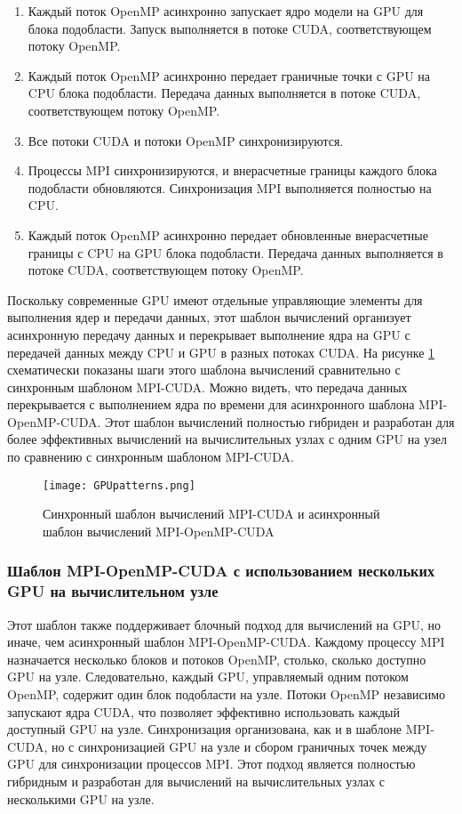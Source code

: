 \begin{enumerate}
\item Каждый поток OpenMP асинхронно запускает ядро модели на GPU для блока подобласти. Запуск выполняется в потоке CUDA, соответствующем потоку OpenMP.
\item Каждый поток OpenMP асинхронно передает граничные точки с GPU на CPU блока подобласти. Передача данных выполняется в потоке CUDA, соответствующем потоку OpenMP.
\item Все потоки CUDA и потоки OpenMP синхронизируются.
\item Процессы MPI синхронизируются, и внерасчетные границы каждого блока подобласти обновляются. Синхронизация MPI выполняется полностью на CPU.
\item Каждый поток OpenMP асинхронно передает обновленные внерасчетные границы с CPU на GPU блока подобласти. Передача данных выполняется в потоке CUDA, соответствующем потоку OpenMP.
\end{enumerate}

Поскольку современные GPU имеют отдельные управляющие элементы для выполнения ядер и передачи данных, этот шаблон вычислений организует асинхронную передачу данных и перекрывает выполнение ядра на GPU с передачей данных между CPU и GPU в разных потоках CUDA. 
На рисунке \ref{fig:GPUpatterns} схематически показаны шаги этого шаблона вычислений сравнительно с синхронным шаблоном MPI-CUDA.
Можно видеть, что передача данных перекрывается с выполнением ядра по времени для асинхронного шаблона MPI-OpenMP-CUDA.
Этот шаблон вычислений полностью гибриден и разработан для более эффективных вычислений на вычислительных узлах с одним GPU на узел по сравнению с синхронным шаблоном MPI-CUDA.

\begin{figure}[!ht]
	\texttt{[image: GPUpatterns.png]}
	\vspace{3pt}
	\caption{Синхронный шаблон вычислений MPI-CUDA и асинхронный шаблон вычислений MPI-OpenMP-CUDA}
	\label{fig:GPUpatterns}
\end{figure}

\subsubsection{Шаблон MPI-OpenMP-CUDA с использованием нескольких GPU на вычислительном узле}

Этот шаблон также поддерживает блочный подход для вычислений на GPU, но иначе, чем асинхронный шаблон MPI-OpenMP-CUDA.
Каждому процессу MPI назначается несколько блоков и потоков OpenMP, столько, сколько доступно GPU на узле. 
Следовательно, каждый GPU, управляемый одним потоком OpenMP, содержит один блок подобласти на узле. 
Потоки OpenMP независимо запускают ядра CUDA, что позволяет эффективно использовать каждый доступный GPU на узле. 
Синхронизация организована, как и в шаблоне MPI-CUDA, но с синхронизацией GPU на узле и сбором граничных точек между GPU для синхронизации процессов MPI. Этот подход является полностью гибридным и разработан для вычислений на вычислительных узлах с несколькими GPU на узле.

\FloatBarrier
